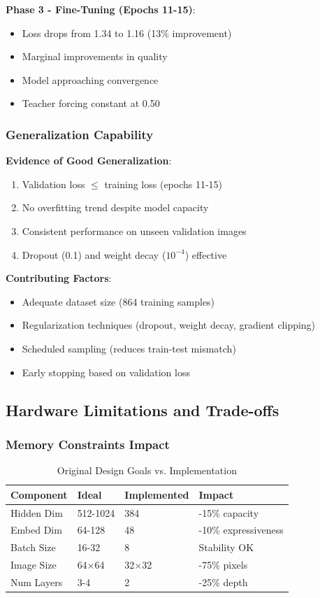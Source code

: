 \documentclass[12pt,a4paper]{article}
\begin{document}
\textbf{Phase 3 - Fine-Tuning (Epochs 11-15)}:
\begin{itemize}
    \item Loss drops from 1.34 to 1.16 (13\% improvement)
    \item Marginal improvements in quality
    \item Model approaching convergence
    \item Teacher forcing constant at 0.50
\end{itemize}

\subsubsection{Generalization Capability}

\textbf{Evidence of Good Generalization}:
\begin{enumerate}
    \item Validation loss $\leq$ training loss (epochs 11-15)
    \item No overfitting trend despite model capacity
    \item Consistent performance on unseen validation images
    \item Dropout (0.1) and weight decay ($10^{-4}$) effective
\end{enumerate}

\textbf{Contributing Factors}:
\begin{itemize}
    \item Adequate dataset size (864 training samples)
    \item Regularization techniques (dropout, weight decay, gradient clipping)
    \item Scheduled sampling (reduces train-test mismatch)
    \item Early stopping based on validation loss
\end{itemize}

\subsection{Hardware Limitations and Trade-offs}

\subsubsection{Memory Constraints Impact}

\begin{table}[H]
\centering
\caption{Original Design Goals vs. Implementation}
\begin{tabular}{@{}llll@{}}
\toprule
\textbf{Component} & \textbf{Ideal} & \textbf{Implemented} & \textbf{Impact} \\ \midrule
Hidden Dim & 512-1024 & 384 & -15\% capacity \\
Embed Dim & 64-128 & 48 & -10\% expressiveness \\
Batch Size & 16-32 & 8 & Stability OK \\
Image Size & 64×64 & 32×32 & -75\% pixels \\
Num Layers & 3-4 & 2 & -25\% depth \\ \bottomrule
\end{tabular}
\end{table}
\end{document}
